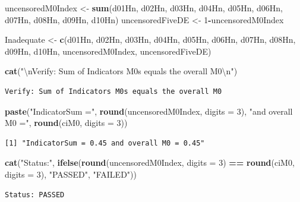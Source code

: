 \documentclass[
]{book}
\newenvironment{Shaded}{\begin{snugshade}}{\end{snugshade}}
\newcommand{\CharTok}[1]{\textcolor[rgb]{0.31,0.60,0.02}{#1}}
\newcommand{\DataTypeTok}[1]{\textcolor[rgb]{0.13,0.29,0.53}{#1}}
\newcommand{\DecValTok}[1]{\textcolor[rgb]{0.00,0.00,0.81}{#1}}
\newcommand{\KeywordTok}[1]{\textcolor[rgb]{0.13,0.29,0.53}{\textbf{#1}}}
\newcommand{\NormalTok}[1]{#1}
\newcommand{\OperatorTok}[1]{\textcolor[rgb]{0.81,0.36,0.00}{\textbf{#1}}}
\newcommand{\StringTok}[1]{\textcolor[rgb]{0.31,0.60,0.02}{#1}}
\begin{document}
\begin{Shaded}
\begin{Highlighting}[]
\NormalTok{uncensoredM0Index \textless{}{-}}\StringTok{ }\KeywordTok{sum}\NormalTok{(d01Hn, d02Hn, d03Hn, d04Hn, d05Hn, d06Hn, d07Hn, d08Hn, d09Hn, d10Hn)}
\NormalTok{uncensoredFiveDE \textless{}{-}}\StringTok{ }\DecValTok{1}\OperatorTok{{-}}\NormalTok{uncensoredM0Index}

\NormalTok{Inadequate \textless{}{-}}\StringTok{ }\KeywordTok{c}\NormalTok{(d01Hn, d02Hn, d03Hn, d04Hn, d05Hn, d06Hn, d07Hn, d08Hn, d09Hn, d10Hn, uncensoredM0Index, uncensoredFiveDE)}

\KeywordTok{cat}\NormalTok{(}\StringTok{"}\CharTok{\textbackslash{}n}\StringTok{Verify: Sum of Indicators M0s equals the overall M0}\CharTok{\textbackslash{}n}\StringTok{"}\NormalTok{)}
\end{Highlighting}
\end{Shaded}

\begin{verbatim}
Verify: Sum of Indicators M0s equals the overall M0
\end{verbatim}

\begin{Shaded}
\begin{Highlighting}[]
\KeywordTok{paste}\NormalTok{(}\StringTok{"IndicatorSum ="}\NormalTok{, }\KeywordTok{round}\NormalTok{(uncensoredM0Index, }\DataTypeTok{digits =} \DecValTok{3}\NormalTok{), }\StringTok{"and overall M0 ="}\NormalTok{, }\KeywordTok{round}\NormalTok{(ciM0, }\DataTypeTok{digits =} \DecValTok{3}\NormalTok{))}
\end{Highlighting}
\end{Shaded}

\begin{verbatim}
[1] "IndicatorSum = 0.45 and overall M0 = 0.45"
\end{verbatim}

\begin{Shaded}
\begin{Highlighting}[]
\KeywordTok{cat}\NormalTok{(}\StringTok{"Status:"}\NormalTok{, }\KeywordTok{ifelse}\NormalTok{(}\KeywordTok{round}\NormalTok{(uncensoredM0Index, }\DataTypeTok{digits =} \DecValTok{3}\NormalTok{) }\OperatorTok{==}\StringTok{ }\KeywordTok{round}\NormalTok{(ciM0, }\DataTypeTok{digits =} \DecValTok{3}\NormalTok{), }\StringTok{"PASSED"}\NormalTok{, }\StringTok{"FAILED"}\NormalTok{))}
\end{Highlighting}
\end{Shaded}

\begin{verbatim}
Status: PASSED
\end{verbatim}
\end{document}
